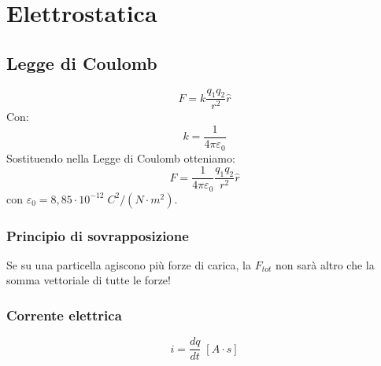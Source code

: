 \chapter{Elettrostatica}

    \section{Legge di Coulomb}
        \begin{equation}
            F = k\frac{q_1q_2}{r^2}\widehat{r}
        \end{equation}
    Con:
        \begin{equation}
            k = \frac{1}{4\pi\varepsilon_0}
        \end{equation}
    Sostituendo nella Legge di Coulomb otteniamo:
        \begin{equation}
            F = \frac{1}{4\pi\varepsilon_0}\frac{q_1q_2}{r^2}\widehat{r}
        \end{equation}
    con $\varepsilon_0 = 8,85\cdot 10^{-12}\;C^2/(N\cdot m^2)$.
        \subsection{Principio di sovrapposizione}
        Se su una particella agiscono più forze di carica, la $F_{tot}$ non 
        sarà altro che la somma vettoriale di tutte le forze!

        \subsection{Corrente elettrica}
            \begin{equation}
                i = \frac{dq}{dt} \; [A \cdot s]
            \end{equation}
    
